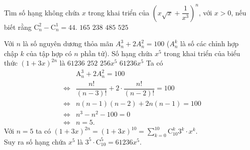 \begin{ex}%
	Tìm số hạng không chứa $x$ trong khai triển của $\left( x\sqrt{x}+ \dfrac{1}{x^3}\right)^n$, với $x>0$, nếu biết rằng $\mathrm{C}_n^2- \mathrm{C}_n^1= 44$.
	\choice
	{\True $165$}
	{$238$}
	{$485$}
	{$525$}
\end{ex}%
\begin{ex}%
	Với $n$ là số nguyên dương thỏa mãn $A_n^3+2A_n^2=100$ ($A_n^k$ là số các chỉnh hợp chập $k$ của tập hợp có $n$ phần tử). Số hạng chứa $x^5$ trong khai triển của biểu thức $(1+3x)^{2n}$ là
	\choice
	{$61236$}
	{$252$}
	{$256x^5$}
	{\True $61236x^5$}
	\loigiai
	{Ta có
		\begin{eqnarray*}
		&&\mathrm{A}_n^3+2A_n^2=100\\
		&\Leftrightarrow& \dfrac{n!}{(n-3)!}+2\cdot \dfrac{n!}{(n-2)!}=100 \\
		&\Leftrightarrow& n(n-1)(n-2)+2n(n-1)=100 \\
		&\Leftrightarrow& n^3-n^2-100=0\\
		&\Leftrightarrow& n=5.
		\end{eqnarray*}
	Với $n=5$ ta có $(1+3x)^{2n}=(1+3x)^{10}=\sum\limits_{k=0}^{10} {\mathrm{C}_{10}^k{3^k}\cdot{x^k}}.$\\
		Suy ra số hạng chứa $x^5$ là $3^5\cdot \mathrm{C}_{10}^{5}=61236x^5$.}
\end{ex}%
